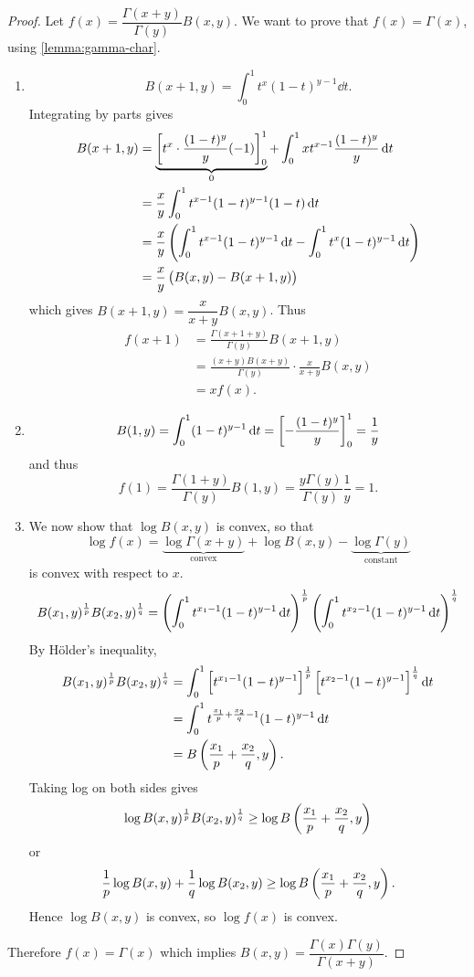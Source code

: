 \begin{proof}
Let $f(x)=\dfrac{\Gamma(x+y)}{\Gamma(y)}B(x,y)$. We want to prove that $f(x)=\Gamma(x)$, using \cref{lemma:gamma-char}.
\begin{enumerate}[label=(\roman*)]
\item \[B(x+1,y)=\int_0^1 t^x(1-t)^{y-1}\dd{t}.\]
Integrating by parts gives
\begin{align*}
B(x+1,y)&=\underbrace{\left[t^x\cdot\frac{(1-t)^y}{y}(-1)\right]_0^1}_{0}+\int_0^1 xt^{x-1}\frac{(1-t)^y}{y}\dd{t}\\
&=\frac{x}{y}\int_0^1 t^{x-1}(1-t)^{y-1}(1-t)\dd{t}\\
&=\frac{x}{y}\left(\int_0^1 t^{x-1}(1-t)^{y-1}\dd{t}-\int_0^1 t^x(1-t)^{y-1}\dd{t}\right)\\
&=\frac{x}{y}\left(B(x,y)-B(x+1,y)\right)
\end{align*}
which gives $B(x+1,y)=\dfrac{x}{x+y}B(x,y)$. Thus
\begin{align*}
f(x+1)&=\frac{\Gamma(x+1+y)}{\Gamma(y)}B(x+1,y)\\
&=\frac{(x+y)B(x+y)}{\Gamma(y)}\cdot\frac{x}{x+y}B(x,y)\\
&=xf(x).
\end{align*}
\item \[B(1,y)=\int_0^1(1-t)^{y-1}\dd{t}=\left[-\frac{(1-t)^y}{y}\right]_0^1=\frac{1}{y}\]
and thus
\[f(1)=\frac{\Gamma(1+y)}{\Gamma(y)}B(1,y)=\frac{y\Gamma(y)}{\Gamma(y)}\frac{1}{y}=1.\]
\item We now show that $\log B(x,y)$ is convex, so that
\[\log f(x)=\underbrace{\log\Gamma(x+y)}_\text{convex}+\log B(x,y)-\underbrace{\log\Gamma(y)}_\text{constant}\]
is convex with respect to $x$.
\[B(x_1,y)^\frac{1}{p}B(x_2,y)^\frac{1}{q}=\left(\int_0^1 t^{x_1-1}(1-t)^{y-1}\dd{t}\right)^\frac{1}{p}\left(\int_0^1 t^{x_2-1}(1-t)^{y-1}\dd{t}\right)^\frac{1}{q}\]
By H\"{o}lder's inequality,
\begin{align*}
B(x_1,y)^\frac{1}{p}B(x_2,y)^\frac{1}{q}
&=\int_0^1\left[t^{x_1-1}(1-t)^{y-1}\right]^\frac{1}{p}\left[t^{x_2-1}(1-t)^{y-1}\right]^\frac{1}{q}\dd{t}\\
&=\int_0^1 t^{\frac{x_1}{p}+\frac{x_2}{q}-1}(1-t)^{y-1}\dd{t}\\
&=B\left(\frac{x_1}{p}+\frac{x_2}{q},y\right).
\end{align*}
Taking log on both sides gives
\[\log B(x,y)^\frac{1}{p}B(x_2,y)^\frac{1}{q}\ge\log B\left(\frac{x_1}{p}+\frac{x_2}{q},y\right)\]
or
\[\frac{1}{p}\log B(x,y)+\frac{1}{q}\log B(x_2,y)\ge\log B\left(\frac{x_1}{p}+\frac{x_2}{q},y\right).\]
Hence $\log B(x,y)$ is convex, so $\log f(x)$ is convex.
\end{enumerate}
Therefore $f(x)=\Gamma(x)$ which implies $B(x,y)=\dfrac{\Gamma(x)\Gamma(y)}{\Gamma(x+y)}$.
\end{proof}


